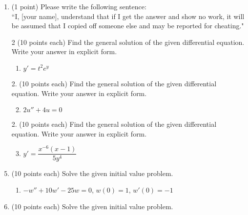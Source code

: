 \documentclass[11pt]{exam}
\begin{document}
\begin{enumerate}
	
\item (1 point) Please write the following sentence: \\

``I, [your name], understand that if I get the answer and show no work, it will be assumed that I copied off someone else and may be reported for cheating."

\newpage
\item[2] (10 points each) Find the general solution of the given differential equation. Write your answer in explicit form. 

\begin{enumerate}
	\item $y'=t^2e^y$
\end{enumerate}

\pagebreak

\item[2.] (10 points each) Find the general solution of the given differential equation. Write your answer in explicit form. 

\begin{enumerate}
	\setcounter{enumii}{1}
	\item $2u''+4u=0$
\end{enumerate}

\pagebreak

\item[2.] (10 points each) Find the general solution of the given differential equation. Write your answer in explicit form. 

\begin{enumerate}
	\setcounter{enumii}{2}
	\item $y'=\dfrac{x^{-6}(x-1)}{5y^4}$
\end{enumerate}

\pagebreak

\setcounter{enumi}{2}
\item (10 points each) Solve the given initial value problem.

\begin{enumerate}
	\setcounter{enumii}{0}
	\item $-w''+10w'-25w=0$, \hspace{.3cm} $w(0)=1$, \hspace{.2cm} $w'(0)=-1$
\end{enumerate}

\pagebreak

\setcounter{enumi}{2}
\item (10 points each) Solve the given initial value problem.


\end{enumerate}
\end{document}
